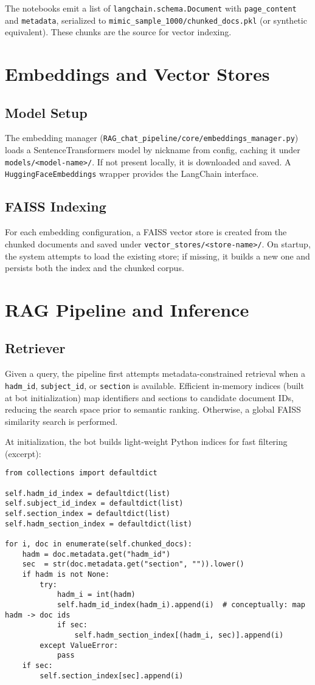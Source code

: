 The notebooks emit a list of \texttt{langchain.schema.Document} with \texttt{page\_content} and \texttt{metadata}, serialized to \texttt{mimic\_sample\_1000/chunked\_docs.pkl} (or synthetic equivalent). These chunks are the source for vector indexing.

\section{Embeddings and Vector Stores}
\subsection{Model Setup}
The embedding manager (\texttt{RAG\_chat\_pipeline/core/embeddings\_manager.py}) loads a SentenceTransformers model by nickname from config, caching it under \texttt{models/<model-name>/}. If not present locally, it is downloaded and saved. A \texttt{HuggingFaceEmbeddings} wrapper provides the LangChain interface.

\subsection{FAISS Indexing}
For each embedding configuration, a FAISS vector store is created from the chunked documents and saved under \texttt{vector\_stores/<store-name>/}. On startup, the system attempts to load the existing store; if missing, it builds a new one and persists both the index and the chunked corpus.

\section{RAG Pipeline and Inference}
\subsection{Retriever}
Given a query, the pipeline first attempts metadata-constrained retrieval when a \texttt{hadm\_id}, \texttt{subject\_id}, or \texttt{section} is available. Efficient in-memory indices (built at bot initialization) map identifiers and sections to candidate document IDs, reducing the search space prior to semantic ranking. Otherwise, a global FAISS similarity search is performed.

At initialization, the bot builds light-weight Python indices for fast filtering (excerpt):
\begin{verbatim}
from collections import defaultdict

self.hadm_id_index = defaultdict(list)
self.subject_id_index = defaultdict(list)
self.section_index = defaultdict(list)
self.hadm_section_index = defaultdict(list)

for i, doc in enumerate(self.chunked_docs):
    hadm = doc.metadata.get("hadm_id")
    sec  = str(doc.metadata.get("section", "")).lower()
    if hadm is not None:
        try:
            hadm_i = int(hadm)
            self.hadm_id_index(hadm_i).append(i)  # conceptually: map hadm -> doc ids
            if sec:
                self.hadm_section_index[(hadm_i, sec)].append(i)
        except ValueError:
            pass
    if sec:
        self.section_index[sec].append(i)
\end{verbatim}

